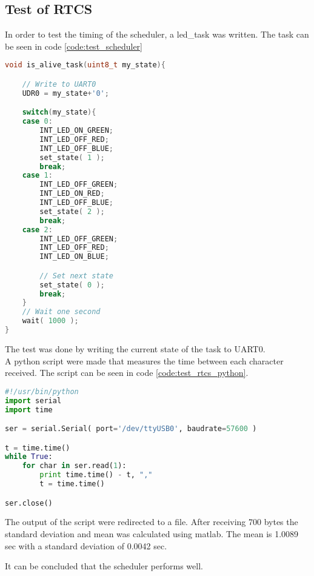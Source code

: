 \subsection{Test of RTCS}
In order to test the timing of the scheduler, a led\_task was written. The task can be seen in code \ref{code:test_scheduler}
\begin{lstlisting}[language = c, caption = RTCS task used in timing test, label=code:test_scheduler]
void is_alive_task(uint8_t my_state){

	// Write to UART0
	UDR0 = my_state+'0';

	switch(my_state){
	case 0:
		INT_LED_ON_GREEN;
		INT_LED_OFF_RED;
		INT_LED_OFF_BLUE;
	    set_state( 1 );
		break;
	case 1:
		INT_LED_OFF_GREEN;
		INT_LED_ON_RED;
		INT_LED_OFF_BLUE;
	    set_state( 2 );
		break;
	case 2:
		INT_LED_OFF_GREEN;
		INT_LED_OFF_RED;
		INT_LED_ON_BLUE;

		// Set next state
	    set_state( 0 );
		break;
	}
	// Wait one second
	wait( 1000 );
}
\end{lstlisting}

The test was done by writing the current state of the task to UART0.\\ A python script were made that measures the time between each character received. The script can be seen in code \ref{code:test_rtcs_python}.
\begin{lstlisting}[language = python, caption = Python code used to measure time between received byte, label=code:test_rtcs_python]
#!/usr/bin/python
import serial
import time

ser = serial.Serial( port='/dev/ttyUSB0', baudrate=57600 )

t = time.time()
while True:
    for char in ser.read(1):
        print time.time() - t, ","
        t = time.time()

ser.close()
\end{lstlisting}
The output of the script were redirected to a file. After receiving 700 bytes the standard deviation and mean was calculated using matlab.
The mean is 1.0089 sec with a standard deviation of 0.0042 sec.

It can be concluded that the scheduler performs well.